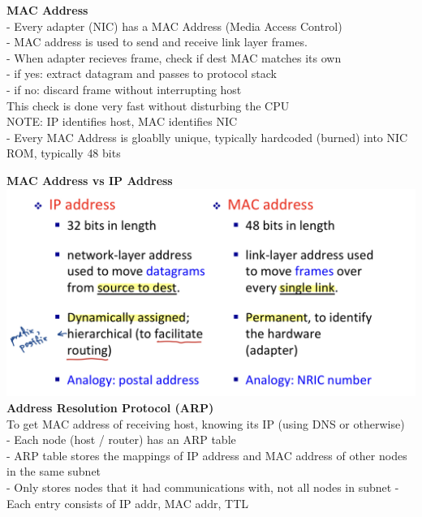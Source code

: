 \documentclass[10pt, a4paper]{article}
\newcommand{\blue}[1]{{\color{MidnightBlue}#1}}
\newcommand{\red}[1]{{\color{red}#1}}
\newcommand{\tab}[0]{\hspace*{2mm}}
\begin{document}
\begin{multicols*}{3}
		\textbf{MAC Address}\\
		- Every adapter (NIC) has a \blue{MAC Address} (Media Access Control)\\
		- MAC address is used to send and receive link layer frames.\\
		\tab - When adapter recieves frame, check if dest MAC matches its own\\
		\tab\tab - if \red{yes}: extract datagram and passes to protocol stack\\
		\tab\tab - if \red{no}: discard frame without interrupting host\\
		This check is done very fast without disturbing the CPU\\
		\red{NOTE:} IP identifies host, MAC identifies NIC\\

		- Every MAC Address is \blue{gloablly unique}, typically \blue{hardcoded (burned)} into NIC ROM, typically \blue{48 bits}

		\textbf{MAC Address vs IP Address}\\
		\includegraphics[scale=.13]{./assets/macVsIp}\\

		\textbf{Address Resolution Protocol (ARP)}\\
		To get MAC address of receiving host, knowing its IP (using DNS or otherwise)\\
		- Each node (host / router) has an \blue{ARP table}\\
		- ARP table stores the mappings of IP address and MAC address of other nodes in the \red{same subnet}\\
		- Only stores nodes that it had communications with, not all nodes in subnet
		- Each entry consists of \red{IP addr, MAC addr, TTL}\\


\end{multicols*}
\end{document}
